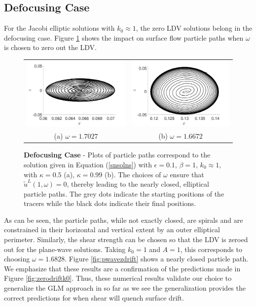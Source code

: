 \documentclass{JFM_Style/jfm}
\begin{document}
\subsection{Defocusing Case}

For the Jacobi elliptic solutions with $k_{0}\approx 1$, the zero LDV solutions belong in the defocusing case.  Figure \ref{fig:jaczerodrift} shows the impact on surface flow particle paths when $\omega$ is chosen to zero out the LDV.
\begin{figure}
\centering
\begin{tabular}{cc}
\includegraphics[width=.48\textwidth]{track_ep_pt1_tf_1_w_1pt703_kap_pt5_foc} & \includegraphics[width=.48\textwidth]{track_ep_pt1_tf_1_w_1pt667_kap_pt99_foc} \\
(a) $\omega=1.7027$ & (b) $\omega=1.6672$ 
\end{tabular}
\caption{\small {\bf Defocusing Case} - Plots of particle paths correspond to the solution given in Equation (\ref{snsolns}) with $\epsilon=0.1$, $\beta=1$, $k_{0}\approx 1$, with $\kappa=0.5$  (a), $\kappa=0.99$ (b). The choices of $\omega$ ensure that $\tilde{u}^{L}(1,\omega)=0$, thereby leading to the nearly closed, elliptical particle paths.  The grey dots indicate the starting positions of the tracers while the black dots indicate their final positions.  }
\label{fig:jaczerodrift}
\end{figure}
As can be seen, the particle paths, while not exactly closed, are spirals and are constrained in their horizontal and vertical extent by an outer elliptical perimeter.  Similarly, the shear strength can be chosen so that the LDV is zeroed out for the plane-wave solutions.  Taking $k_{0}=1$ and $A=1$, this corresponds to choosing $\omega = 1.6828$.  Figure \ref{fig:pwavezdrift} shows a nearly closed particle path.  We emphasize that these results are a confirmation of the predictions made in Figure \ref{fig:zerodriftk0}.  Thus, these numerical results validate our choice to generalize the GLM approach in so far as we see the generalization provides the correct predictions for when shear will quench surface drift.
\end{document}
